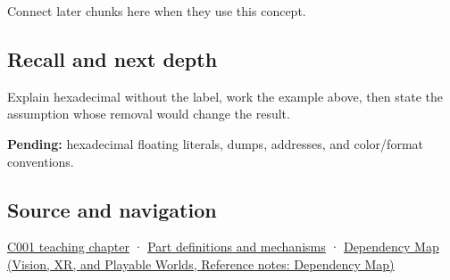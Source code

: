 Connect later chunks here when they use this concept.

\subsection{Recall and next depth}\label{appendix-6b8075763724-recall-and-next-depth}

Explain hexadecimal without the label, work the example above, then state the assumption whose removal would change the result.

\textbf{Pending:} hexadecimal floating literals, dumps, addresses, and color/format conventions.

\subsection{Source and navigation}\label{appendix-6b8075763724-source-and-navigation}

\hyperref[01-foundations-i-ch001-from-a-signal-to-an-interpretation]{C001 teaching chapter} · \hyperref[appendix-fd090d982a15]{Part definitions and mechanisms} · \href{../07-Vision-XR-and-Playable-Worlds/main.pdf\#nameddest=appendix-4ad47bdd269a}{Dependency Map (Vision, XR, and Playable Worlds, Reference notes: Dependency Map)}
